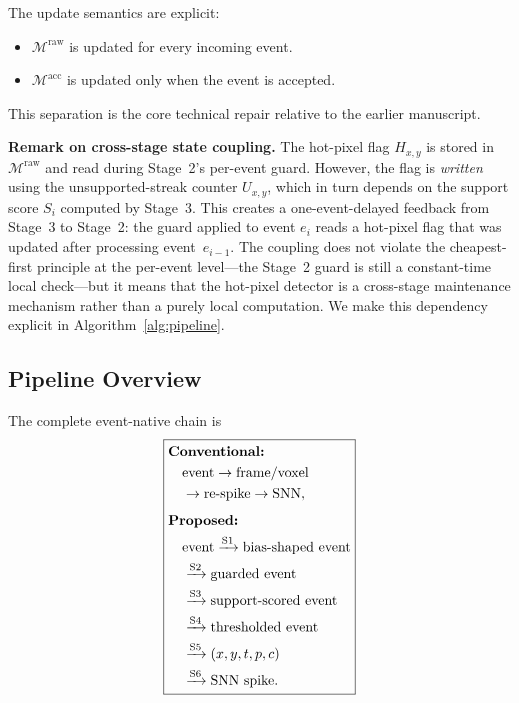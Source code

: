 \documentclass[a4paper,fleqn]{cas-dc}
\begin{document}
The update semantics are explicit:
\begin{itemize}
\item $\mathcal{M}^{\text{raw}}$ is updated for every incoming event.
\item $\mathcal{M}^{\text{acc}}$ is updated only when the event is accepted.
\end{itemize}
This separation is the core technical repair relative to the earlier manuscript.

\textbf{Remark on cross-stage state coupling.}
The hot-pixel flag $H_{x,y}$ is stored in $\mathcal{M}^{\text{raw}}$ and read during Stage~2's per-event guard. However, the flag is \emph{written} using the unsupported-streak counter $U_{x,y}$, which in turn depends on the support score $S_i$ computed by Stage~3. This creates a one-event-delayed feedback from Stage~3 to Stage~2: the guard applied to event $e_i$ reads a hot-pixel flag that was updated after processing event~$e_{i-1}$. The coupling does not violate the cheapest-first principle at the per-event level---the Stage~2 guard is still a constant-time local check---but it means that the hot-pixel detector is a cross-stage maintenance mechanism rather than a purely local computation. We make this dependency explicit in Algorithm~\ref{alg:pipeline}.

\subsection{Pipeline Overview}
\label{sec:pipeline}

The complete event-native chain is
\begin{equation}
\boxed{
\begin{aligned}
&\text{\textbf{Conventional:}} \\
&\quad \text{event} \to \text{frame/voxel} \\
&\quad \to \text{re-spike} \to \text{SNN}, \\[1ex]
&\text{\textbf{Proposed:}} \\
&\quad \text{event} \xrightarrow{\text{S1}} \text{bias-shaped event} \\
&\quad \xrightarrow{\text{S2}} \text{guarded event} \\
&\quad \xrightarrow{\text{S3}} \text{support-scored event} \\
&\quad \xrightarrow{\text{S4}} \text{thresholded event} \\
&\quad \xrightarrow{\text{S5}} (x,y,t,p,c) \\
&\quad \xrightarrow{\text{S6}} \text{SNN spike}.
\end{aligned}
}
\label{eq:pipeline}
\end{equation}
\end{document}
